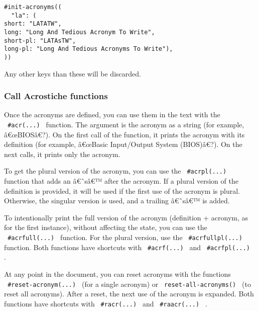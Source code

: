 \begin{verbatim}
#init-acronyms((
  "la": (
short: "LATATW",
long: "Long And Tedious Acronym To Write",
short-pl: "LATAsTW",
long-pl: "Long And Tedious Acronyms To Write"),
))
\end{verbatim}

Any other keys than these will be discarded.

\subsubsection{Call Acrostiche
functions}\label{call-acrostiche-functions}

Once the acronyms are defined, you can use them in the text with the
\texttt{\ \#acr(...)\ } function. The argument is the acronym as a
string (for example, â€œBIOSâ€?). On the first call of the function, it
prints the acronym with its definition (for example, â€œBasic
Input/Output System (BIOS)â€?). On the next calls, it prints only the
acronym.

To get the plural version of the acronym, you can use the
\texttt{\ \#acrpl(...)\ } function that adds an â€˜sâ€™ after the
acronym. If a plural version of the definition is provided, it will be
used if the first use of the acronym is plural. Otherwise, the singular
version is used, and a trailing â€˜sâ€™ is added.

To intentionally print the full version of the acronym (definition +
acronym, as for the first instance), without affecting the state, you
can use the \texttt{\ \#acrfull(...)\ } function. For the plural
version, use the \texttt{\ \#acrfullpl(...)\ } function. Both functions
have shortcuts with \texttt{\ \#acrf(...)\ } and
\texttt{\ \#acrfpl(...)\ } .

At any point in the document, you can reset acronyms with the functions
\texttt{\ \#reset-acronym(...)\ } (for a single acronym) or
\texttt{\ reset-all-acronyms()\ } (to reset all acronyms). After a
reset, the next use of the acronym is expanded. Both functions have
shortcuts with \texttt{\ \#racr(...)\ } and \texttt{\ \#raacr(...)\ } .

